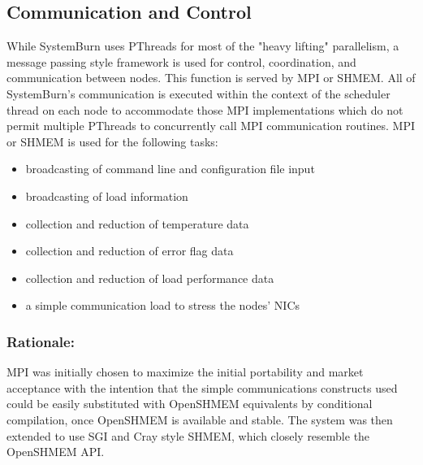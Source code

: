 \subsection{Communication and Control}

While SystemBurn uses PThreads for most of the "heavy lifting" parallelism,
a message passing style framework is used for control, coordination, and
communication between nodes. This function is served by MPI or SHMEM. All
of SystemBurn's communication is executed within the context of the scheduler
thread on each node to accommodate those MPI implementations which do not
permit multiple PThreads to concurrently call MPI communication routines.
MPI or SHMEM is used for the following tasks:

\begin{itemize}
	\item broadcasting of command line and configuration file input
	\item broadcasting of load information
	\item collection and reduction of temperature data
	\item collection and reduction of error flag data
	\item collection and reduction of load performance data
	\item a simple communication load to stress the nodes' NICs
\end{itemize}

\subsubsection{Rationale:}
MPI was initially chosen to maximize the initial portability and market 
acceptance with the intention that the simple communications constructs 
used could be easily substituted with OpenSHMEM equivalents by 
conditional compilation, once OpenSHMEM is available and stable. The 
system was then extended to use SGI and Cray style SHMEM, which closely
resemble the OpenSHMEM API.
